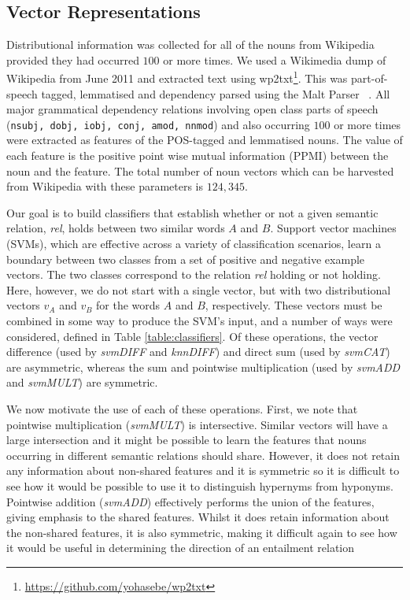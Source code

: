 \documentclass[11pt]{article}
\begin{document}
\subsection{Vector Representations}
\label{sect:representations}

Distributional information was collected for all of the nouns from
Wikipedia provided they had occurred $100$ or more times. We used a 
Wikimedia dump of Wikipedia from June 2011 and extracted text using
wp2txt\footnote{\url{https://github.com/yohasebe/wp2txt}}. This was part-of-speech tagged, lemmatised and dependency parsed using the Malt Parser ~\cite{Nivre2004}.  All major grammatical dependency relations involving open class parts of speech ({\tt nsubj, dobj, iobj, conj, amod, nnmod}) and also occurring $100$ or more times were extracted as features of the POS-tagged and lemmatised nouns.  The value of each feature is the positive point wise mutual information (PPMI) \cite{Church:1989} between the noun and
the feature. The total number of noun vectors which can be harvested
from Wikipedia with these parameters is $124,345$.

Our goal is to build classifiers that establish whether or not a given
semantic relation, \emph{rel}, holds between two similar words $A$ and
$B$.  Support vector machines (SVMs), which are effective across a
variety of classification scenarios, learn a boundary between two
classes from a set of positive and negative example vectors.  The two
classes correspond to the relation \emph{rel} holding or not holding.
Here, however, we do not start with a single vector, but with two
distributional vectors $v_A$ and $v_B$ for the words $A$ and $B$,
respectively. These vectors must be combined in some way to produce
the SVM's input, and a number of ways were considered, defined in
Table \ref{table:classifiers}.  Of these operations, the vector difference (used by \emph{svm\-DIFF} and
\emph{knnDIFF}) and direct sum (used by \emph{svmCAT}) are asymmetric, whereas
the sum and pointwise multiplication (used by \emph{svmADD} and
\emph{svmMULT}) are symmetric. 


We now motivate the use of each of these operations.  First, we note that pointwise multiplication (\emph{svmMULT}) is intersective.  Similar vectors will have a large intersection and it might be possible to learn the features that nouns occurring in different semantic relations should share.  However, it does not retain any information about non-shared features and it is symmetric so it is difficult to see how it would be possible to use it to distinguish hypernyms from hyponyms.  Pointwise addition (\emph{svmADD}) effectively performs the union of the features, giving emphasis to the shared features.  Whilst it does retain information about the non-shared features, it is also symmetric, making it difficult again to see how it would be useful in determining the direction of an entailment relation
\end{document}
